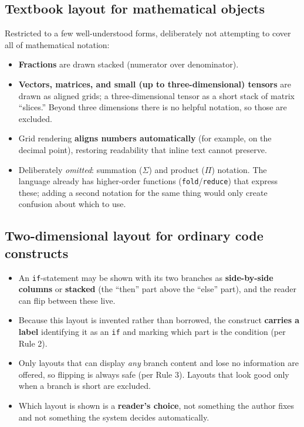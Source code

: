 \documentclass[11pt]{article}
\newcommand{\req}[1]{\textbf{\color{accent}#1}}
\begin{document}
\subsection{Textbook layout for mathematical objects}
Restricted to a few well-understood forms, deliberately not attempting to cover all of mathematical notation:
\begin{itemize}[leftmargin=1.4em,itemsep=3pt]
  \item \req{Fractions} are drawn stacked (numerator over denominator).
  \item \req{Vectors, matrices, and small (up to three-dimensional) tensors} are drawn as aligned grids; a three-dimensional tensor as a short stack of matrix ``slices.'' Beyond three dimensions there is no helpful notation, so those are excluded.
  \item Grid rendering \req{aligns numbers automatically} (for example, on the decimal point), restoring readability that inline text cannot preserve.
  \item Deliberately \emph{omitted}: summation ($\Sigma$) and product ($\Pi$) notation. The language already has higher-order functions (\texttt{fold}/\texttt{reduce}) that express these; adding a second notation for the same thing would only create confusion about which to use.
\end{itemize}

\subsection{Two-dimensional layout for ordinary code constructs}
\begin{itemize}[leftmargin=1.4em,itemsep=3pt]
  \item An \texttt{if}-statement may be shown with its two branches as \req{side-by-side columns} or \req{stacked} (the ``then'' part above the ``else'' part), and the reader can flip between these live.
  \item Because this layout is invented rather than borrowed, the construct \req{carries a label} identifying it as an \texttt{if} and marking which part is the condition (per Rule 2).
  \item Only layouts that can display \emph{any} branch content and lose no information are offered, so flipping is always safe (per Rule 3). Layouts that look good only when a branch is short are excluded.
  \item Which layout is shown is a \req{reader's choice}, not something the author fixes and not something the system decides automatically.
\end{itemize}
\end{document}
